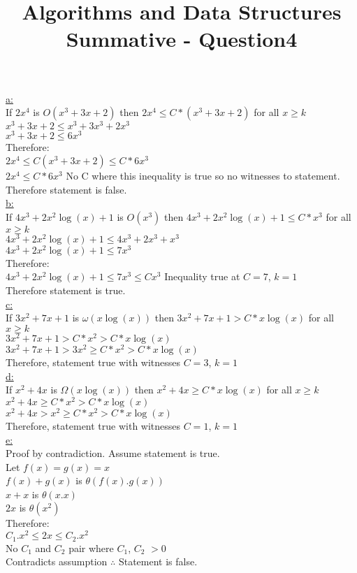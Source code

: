 \documentclass[10pt,a4paper]{article}
\title{Algorithms and Data Structures Summative - Question4}
\begin{document}
	\underline{a:}\\ 	
	If $2x^4$ is $O(x^3 + 3x + 2)$ then $2x^4 \leq C*(x^3 + 3x + 2)$ for all $x \geq k$\\	
	$x^3 + 3x + 2 \leq x^3 + 3x^3 + 2x^3$\\	
	$x^3 + 3x + 2 \leq 6x^3$\\	
	Therefore:\\	
	$2x^4 \leq C(x^3 + 3x + 2) \leq C * 6x^3$\\
	$2x^4 \leq C *6x^3$ No C where this inequality is true so no witnesses to statement.\\ 	
	Therefore statement is false.\\
	
	\underline{b:} \\
	If $4x^3 + 2x^2\log(x) + 1$ is $O(x^3)$ then $4x^3 + 2x^2\log(x) + 1 \leq C*x^3$ for all $x \geq k$ \\
	$4x^3 + 2x^2\log(x) + 1 \leq 4x^3 + 2x^3 + x^3$\\
	$4x^3 + 2x^2\log(x) + 1 \leq 7x^3$\\
	Therefore:\\
	$4x^3 + 2x^2\log(x) + 1 \leq 7x^3 \leq Cx^3$ Inequality true at $C=7$, $k=1$\\
	Therefore statement is true.\\
	
	\underline{c:}\\
	If $3x^2 + 7x + 1$ is $\omega (x\log(x))$ then $3x^2 + 7x + 1 > C*x\log(x)$ for all $x \geq k$\\
	$3x^2 + 7x + 1 > C*x^2 > C*x\log(x)$\\
	$3x^2 + 7x + 1 > 3x^2 \geq C*x^2 > C*x\log(x)$\\
	Therefore, statement true with witnesses $C=3$, $k=1$\\
	
	\underline{d:}\\
	If $x^2 + 4x$ is $\Omega(x\log(x))$ then $x^2 + 4x \geq C*x\log(x)$ for all $x \geq k$ \\
	$x^2 + 4x \geq C*x^2 > C*x\log(x)$\\
	$x^2 + 4x > x^2 \geq C*x^2 > C*x\log(x)$\\
	Therefore, statement true with witnesses $C=1$, $k=1$\\
	
	\underline{e:}\\
	Proof by contradiction. Assume statement is true.\\
	Let $f(x) = g(x) = x$\\
	$f(x) + g(x)$ is $\theta(f(x).g(x))$\\
	$x + x$ is $\theta(x.x)$\\
	$2x$ is $\theta(x^2)$\\
	Therefore:\\
	$C_1.x^2 \leq 2x \leq C_2.x^2$\\
	No $C_1$ and $C_2$ pair where $C_1$, $C_2$ $>0$ \\
	Contradicts assumption $\therefore$ Statement is false.
	
\end{document}
